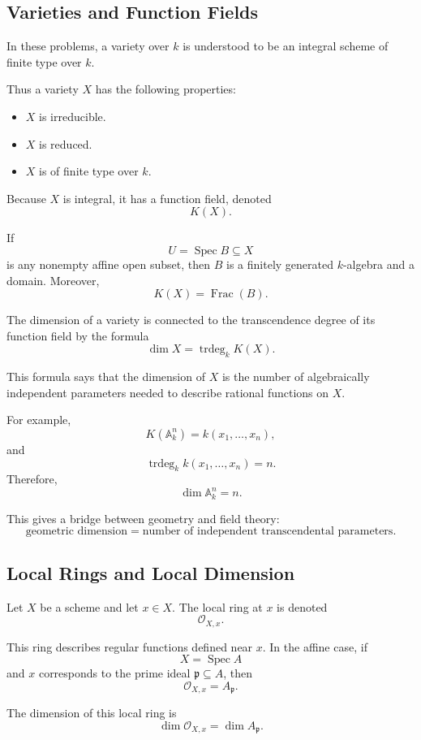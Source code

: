 \documentclass[12pt,a4paper]{article}
\DeclareMathOperator{\Spec}{Spec}
\newcommand{\Frac}{\operatorname{Frac}}
\newcommand{\trdeg}{\operatorname{trdeg}}
\providecommand{\Spec}{\operatorname{Spec}}
\theoremstyle{notespace}
\begin{document}
\subsection{Varieties and Function Fields}

In these problems, a variety over \(k\) is understood to be an integral scheme of finite type over \(k\).

Thus a variety \(X\) has the following properties:

\begin{itemize}
	\item \(X\) is irreducible.
	\item \(X\) is reduced.
	\item \(X\) is of finite type over \(k\).
\end{itemize}

Because \(X\) is integral, it has a function field, denoted
\[
K(X).
\]

If
\[
U=\Spec B\subseteq X
\]
is any nonempty affine open subset, then \(B\) is a finitely generated \(k\)-algebra and a domain. Moreover,
\[
K(X)=\Frac(B).
\]

The dimension of a variety is connected to the transcendence degree of its function field by the formula
\[
\boxed{
	\dim X=\trdeg_k K(X).
}
\]

This formula says that the dimension of \(X\) is the number of algebraically independent parameters needed to describe rational functions on \(X\).

For example,
\[
K(\mathbb A^n_k)=k(x_1,\dots,x_n),
\]
and
\[
\trdeg_k k(x_1,\dots,x_n)=n.
\]
Therefore,
\[
\dim \mathbb A^n_k=n.
\]

This gives a bridge between geometry and field theory:
\[
\boxed{
	\text{geometric dimension}
	=
	\text{number of independent transcendental parameters}.
}
\]

\subsection{Local Rings and Local Dimension}

Let \(X\) be a scheme and let \(x\in X\). The local ring at \(x\) is denoted
\[
\mathcal O_{X,x}.
\]

This ring describes regular functions defined near \(x\). In the affine case, if
\[
X=\Spec A
\]
and \(x\) corresponds to the prime ideal \(\mathfrak p\subseteq A\), then
\[
\mathcal O_{X,x}=A_{\mathfrak p}.
\]

The dimension of this local ring is
\[
\dim \mathcal O_{X,x}
=
\dim A_{\mathfrak p}.
\]
\end{document}
